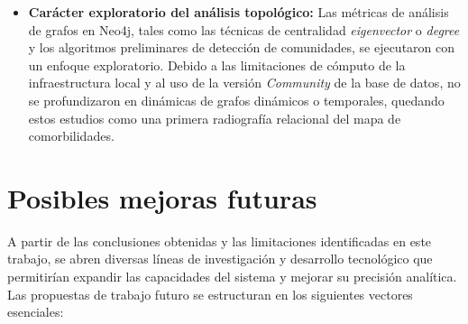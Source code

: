\documentclass[12pt,a4paper,onecolumn,oneside]{report}
\begin{document}
\begin{itemize}
    \item \textbf{Carácter exploratorio del análisis topológico:} Las métricas de análisis de grafos en Neo4j, tales como las técnicas de centralidad \textit{eigenvector} o \textit{degree} y los algoritmos preliminares de detección de comunidades, se ejecutaron con un enfoque exploratorio. Debido a las limitaciones de cómputo de la infraestructura local y al uso de la versión \textit{Community} de la base de datos, no se profundizaron en dinámicas de grafos dinámicos o temporales, quedando estos estudios como una primera radiografía relacional del mapa de comorbilidades.
\end{itemize}

\section{Posibles mejoras futuras}

A partir de las conclusiones obtenidas y las limitaciones identificadas en este trabajo, se abren diversas líneas de investigación y desarrollo tecnológico que permitirían expandir las capacidades del sistema y mejorar su precisión analítica. Las propuestas de trabajo futuro se estructuran en los siguientes vectores esenciales:
\end{document}
